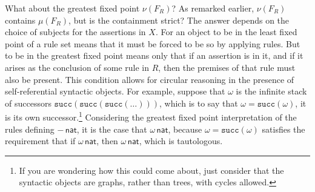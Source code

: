 \documentclass[11pt,twoside]{article}
\newcommand{\IsNat}[1]{{#1}\,\mathsf{nat}}
\newcommand{\succnat}[1]{\mathtt{succ}(#1)}
\begin{document}
\smallskip

What about the greatest fixed point $\nu(F_{R})$?  As remarked earlier, $\nu(F_{R})$ contains
$\mu(F_{R})$, but is the containment strict?  The answer depends on the choice of subjects
for the assertions in $X$.  For an object to be in the least fixed point of a rule set
means that it must be forced to be so by applying rules.  But to be in the greatest fixed
point means only that if an assertion is in it, and if it arises as the conclusion of some
rule in $R$, then the premises of that rule must also be present.  This condition allows
for circular reasoning in the presence of self-referential syntactic objects.  For
example, suppose that $\omega$ is the infinite stack of successors
$\succnat{\succnat{\succnat{\dots}}}$, which is to say that $\omega=\succnat{\omega}$, it is its own
successor.\footnote{If you are wondering how this could come about, just consider that the
  syntactic objects are graphs, rather than trees, with cycles allowed.}  Considering the
greatest fixed point interpretation of the rules defining $\IsNat{-}$, it is the case that
$\IsNat{\omega}$, because $\omega=\succnat{\omega}$ satisfies the requirement that if
$\IsNat{\omega}$, then $\IsNat{\omega}$, which is tautologous.



\end{document}
